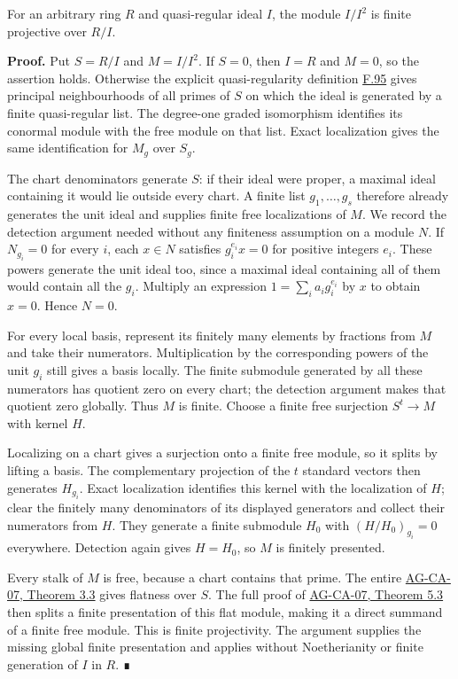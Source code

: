 \documentclass[11pt,a4paper,openany]{report}
\begin{document}
For an arbitrary ring \(R\) and quasi-regular ideal \(I\), the module \(I/I^2\) is finite projective over \(R/I\).

\textbf{Proof.} Put \(S=R/I\) and \(M=I/I^2\). If \(S=0\), then \(I=R\) and \(M=0\), so the assertion holds. Otherwise the explicit quasi-regularity definition \hyperref[AG-RG-S05-more-algebra-definition-regular-ideal]{F.95} gives principal neighbourhoods of all primes of \(S\) on which the ideal is generated by a finite quasi-regular list. The degree-one graded isomorphism identifies its conormal module with the free module on that list. Exact localization gives the same identification for \(M_g\) over \(S_g\).

The chart denominators generate \(S\): if their ideal were proper, a maximal ideal containing it would lie outside every chart. A finite list \(g_1,\ldots,g_s\) therefore already generates the unit ideal and supplies finite free localizations of \(M\). We record the detection argument needed without any finiteness assumption on a module \(N\). If \(N_{g_i}=0\) for every \(i\), each \(x\in N\) satisfies \(g_i^{e_i}x=0\) for positive integers \(e_i\). These powers generate the unit ideal too, since a maximal ideal containing all of them would contain all the \(g_i\). Multiply an expression \(1=\sum_i a_i g_i^{e_i}\) by \(x\) to obtain \(x=0\). Hence \(N=0\).

For every local basis, represent its finitely many elements by fractions from \(M\) and take their numerators. Multiplication by the corresponding powers of the unit \(g_i\) still gives a basis locally. The finite submodule generated by all these numerators has quotient zero on every chart; the detection argument makes that quotient zero globally. Thus \(M\) is finite. Choose a finite free surjection \(S^t\to M\) with kernel \(H\).

Localizing on a chart gives a surjection onto a finite free module, so it splits by lifting a basis. The complementary projection of the \(t\) standard vectors then generates \(H_{g_i}\). Exact localization identifies this kernel with the localization of \(H\); clear the finitely many denominators of its displayed generators and collect their numerators from \(H\). They generate a finite submodule \(H_0\) with \((H/H_0)_{g_i}=0\) everywhere. Detection again gives \(H=H_0\), so \(M\) is finitely presented.

Every stalk of \(M\) is free, because a chart contains that prime. The entire \href{https://github.com/KokunoYumeto/open-math-courses/blob/d02d0a3669f42579db037cd44de1d113fdd770a1/docs/courses/AG-CA/src/tor-and-flat-modules.md}{AG-CA-07, Theorem 3.3} gives flatness over \(S\). The full proof of \href{https://github.com/KokunoYumeto/open-math-courses/blob/d02d0a3669f42579db037cd44de1d113fdd770a1/docs/courses/AG-CA/src/tor-and-flat-modules.md}{AG-CA-07, Theorem 5.3} then splits a finite presentation of this flat module, making it a direct summand of a finite free module. This is finite projectivity. The argument supplies the missing global finite presentation and applies without Noetherianity or finite generation of \(I\) in \(R\). ∎
\end{document}
